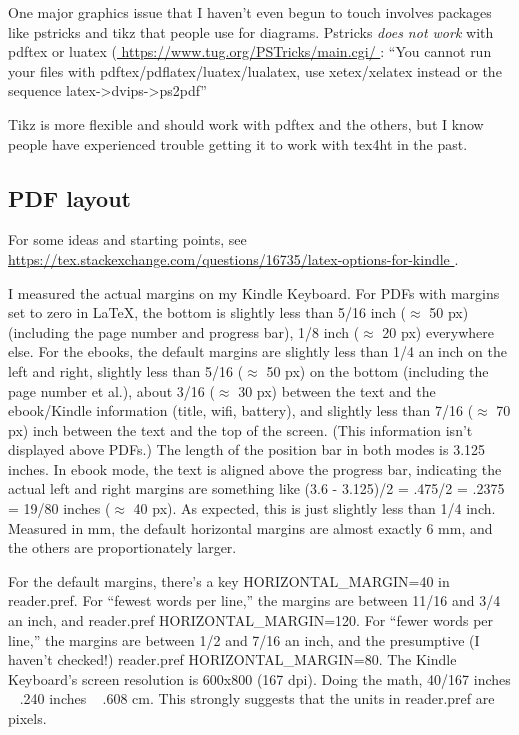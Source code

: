\documentclass[12pt]{article}
\begin{document}
One major graphics issue that I haven't even begun to touch involves
packages like pstricks and tikz that people use for diagrams.
Pstricks \emph{does not work} with pdftex or luatex (\url{
https://www.tug.org/PSTricks/main.cgi/
}: ``You cannot run your files with pdftex/pdflatex/luatex/lualatex, use xetex/xelatex instead or the sequence latex->dvips->ps2pdf''

Tikz is more flexible and should work with pdftex and the others, but
I know people have experienced trouble getting it to work with tex4ht
in the past.


\subsection{PDF layout}
\label{sec:pdf}

For some ideas and starting points, see \url{
  https://tex.stackexchange.com/questions/16735/latex-options-for-kindle
}.

I measured the actual margins on my Kindle Keyboard.  For PDFs with
margins set to zero in \LaTeX, the bottom is slightly less than 5/16
inch ($\approx$ 50 px) (including the page number and progress bar), 1/8
inch ($\approx$ 20 px) everywhere else.  For the ebooks, the default
margins are slightly less than 1/4 an inch on the left and right,
slightly less than 5/16 ($\approx$ 50 px) on the bottom (including the
page number et al.), about 3/16 ($\approx$ 30 px) between the text and
the ebook/Kindle information (title, wifi, battery), and slightly less
than 7/16 ($\approx$ 70 px) inch between the text and the top of the
screen.  (This information isn't displayed above PDFs.)  The length of
the position bar in both modes is 3.125 inches.  In ebook mode, the
text is aligned above the progress bar, indicating the actual left and
right margins are something like (3.6 - 3.125)/2 = .475/2 = .2375 =
19/80 inches ($\approx$ 40 px).  As expected, this is just slightly less
than 1/4 inch.  Measured in mm, the default horizontal margins are
almost exactly 6 mm, and the others are proportionately larger.

For the default margins, there's a key HORIZONTAL\_MARGIN=40 in
reader.pref.  For ``fewest words per line,'' the margins are between
11/16 and 3/4 an inch, and reader.pref HORIZONTAL\_MARGIN=120.  For
``fewer words per line,'' the margins are between 1/2 and 7/16 an
inch, and the presumptive (I haven't checked!)  reader.pref
HORIZONTAL\_MARGIN=80.  The Kindle Keyboard's screen resolution is
600x800 (167 dpi).  Doing the math, 40/167 inches ~ .240 inches ~ .608
cm.  This strongly suggests that the units in reader.pref are pixels.
\end{document}
